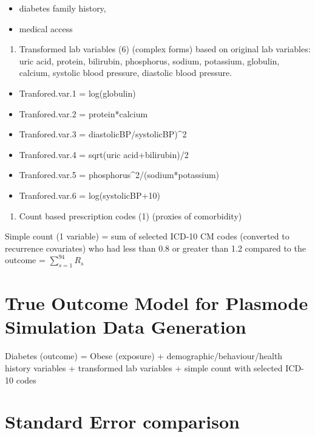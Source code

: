 \documentclass[
  10pt,
]{article}
\providecommand{\tightlist}{%
  \setlength{\itemsep}{0pt}\setlength{\parskip}{0pt}}
\begin{document}
\begin{itemize}
\tightlist
\item
  diabetes family history,
\item
  medical access
\end{itemize}

\begin{enumerate}
\def\labelenumi{\arabic{enumi}.}
\setcounter{enumi}{3}
\tightlist
\item
  Transformed lab variables (6) (complex forms) based on original lab
  variables: uric acid, protein, bilirubin, phosphorus, sodium,
  potassium, globulin, calcium, systolic blood pressure, diastolic blood
  pressure.
\end{enumerate}

\begin{itemize}
\tightlist
\item
  Tranfored.var.1 = log(globulin)
\item
  Tranfored.var.2 = protein*calcium
\item
  Tranfored.var.3 = diastolicBP/systolicBP)\^{}2
\item
  Tranfored.var.4 = sqrt(uric acid+bilirubin)/2
\item
  Tranfored.var.5 = phosphorus\^{}2/(sodium*potassium)
\item
  Tranfored.var.6 = log(systolicBP+10)
\end{itemize}

\begin{enumerate}
\def\labelenumi{\arabic{enumi}.}
\setcounter{enumi}{4}
\tightlist
\item
  Count based prescription codes (1) (proxies of comorbidity)
\end{enumerate}

Simple count (1 variable) = sum of selected ICD-10 CM codes (converted
to recurrence covariates) who had less than 0.8 or greater than 1.2
compared to the outcome = \(\sum_{s=1}^{94} R_s\)

\section{True Outcome Model for Plasmode Simulation Data
Generation}\label{true-outcome-model-for-plasmode-simulation-data-generation}

Diabetes (outcome) = Obese (exposure) + demographic/behaviour/health
history variables + transformed lab variables + simple count with
selected ICD-10 codes

\section{Standard Error comparison}\label{standard-error-comparison}
\end{document}
